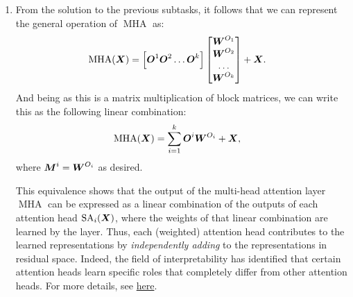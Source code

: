 \documentclass[11pt,a4paper]{article}
\newcommand\op[1]{\operatorname{#1}}
\begin{document}
\begin{enumerate}[label=(\alph*)]
          block of $\mW^O$ that corresponds to $\mO^i$.
          That is, we can also see $\mW^O$ as the following block matrix:
          \begin{align}
              \mW^O & = \left[\mW^{O_1} \mW^{O_2} \ldots \mW^{O_k}\right]^\top.
          \end{align}
    \item From the solution to the previous subtasks, it follows that we can
          represent the general operation of $\op{MHA}$ as:
          \begin{align}
              \op{MHA}(\mX) & = \left[\mO^1\mO^2\ldots\mO^k\right] \begin{bmatrix}
                                                                       \mW^{O_1} \\
                                                                       \mW^{O_2} \\
                                                                       \ldots    \\
                                                                       \mW^{O_k}
                                                                   \end{bmatrix}
              + \mX.
          \end{align}
          And being as this is a matrix multiplication of block matrices, we
          can write this as the following linear combination:
          \begin{align}
              \op{MHA}(\mX) & = \sum_{i=1}^{k} \mO^i\mW^{O_i} + \mX,
          \end{align}
          where ${\boldsymbol{M}}^i = {\boldsymbol{W}}^{O_i}$ as desired.

          This equivalence shows that the output of the multi-head attention
          layer $\op{MHA}$ can be expressed as a linear combination of the
          outputs of each attention head $\op{SA}_i(\mX)$, where the weights
          of that linear combination are learned by the layer.
          Thus, each (weighted) attention head contributes to the
          learned representations by \emph{independently adding} to the 
          representations in residual space. 
          Indeed, the field of interpretability has identified that certain 
          attention heads learn specific roles that completely differ from other
          attention heads.
          For more details, see \href{https://transformer-circuits.pub/2021/framework/index.html}{here}.
\end{enumerate}
\end{document}
